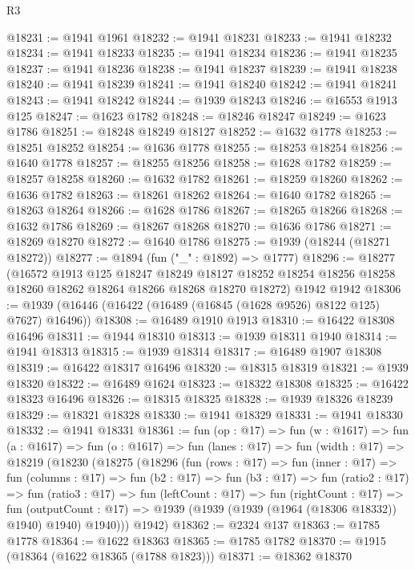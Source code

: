 \begin{lexlean}{R3}
\begin{coremodule}
@18231 := @1941 @1961
@18232 := @1941 @18231
@18233 := @1941 @18232
@18234 := @1941 @18233
@18235 := @1941 @18234
@18236 := @1941 @18235
@18237 := @1941 @18236
@18238 := @1941 @18237
@18239 := @1941 @18238
@18240 := @1941 @18239
@18241 := @1941 @18240
@18242 := @1941 @18241
@18243 := @1941 @18242
@18244 := @1939 @18243
@18246 := @16553 @1913 @125
@18247 := @1623 @1782
@18248 := @18246 @18247
@18249 := @1623 @1786
@18251 := @18248 @18249 @18127
@18252 := @1632 @1778
@18253 := @18251 @18252
@18254 := @1636 @1778
@18255 := @18253 @18254
@18256 := @1640 @1778
@18257 := @18255 @18256
@18258 := @1628 @1782
@18259 := @18257 @18258
@18260 := @1632 @1782
@18261 := @18259 @18260
@18262 := @1636 @1782
@18263 := @18261 @18262
@18264 := @1640 @1782
@18265 := @18263 @18264
@18266 := @1628 @1786
@18267 := @18265 @18266
@18268 := @1632 @1786
@18269 := @18267 @18268
@18270 := @1636 @1786
@18271 := @18269 @18270
@18272 := @1640 @1786
@18275 := @1939 (@18244 (@18271 @18272))
@18277 := @1894 (fun ("_" : @1892) => @1777)
@18296 := @18277
    (@16572
      @1913
      @125
      @18247
      @18249
      @18127
      @18252
      @18254
      @18256
      @18258
      @18260
      @18262
      @18264
      @18266
      @18268
      @18270
      @18272)
    @1942
    @1942
@18306 := @1939 (@16446 (@16422 (@16489 (@16845 (@1628 @9526) @8122 @125) @7627) @16496))
@18308 := @16489 @1910 @1913
@18310 := @16422 @18308 @16496
@18311 := @1944 @18310
@18313 := @1939 @18311 @1940
@18314 := @1941 @18313
@18315 := @1939 @18314
@18317 := @16489 @1907 @18308
@18319 := @16422 @18317 @16496
@18320 := @18315 @18319
@18321 := @1939 @18320
@18322 := @16489 @1624
@18323 := @18322 @18308
@18325 := @16422 @18323 @16496
@18326 := @18315 @18325
@18328 := @1939 @18326 @18239
@18329 := @18321 @18328
@18330 := @1941 @18329
@18331 := @1941 @18330
@18332 := @1941 @18331
@18361 := fun (op : @17) =>
  fun (w : @1617) =>
  fun (a : @1617) =>
  fun (o : @1617) =>
  fun (lanes : @17) =>
  fun (width : @17) =>
  @18219
    (@18230
      (@18275
        (@18296
          (fun (rows : @17) =>
          fun (inner : @17) =>
          fun (columns : @17) =>
          fun (b2 : @17) =>
          fun (b3 : @17) =>
          fun (ratio2 : @17) =>
          fun (ratio3 : @17) =>
          fun (leftCount : @17) =>
          fun (rightCount : @17) =>
          fun (outputCount : @17) =>
          @1939 (@1939 (@1939 (@1964 (@18306 @18332)) @1940) @1940) @1940)))
      @1942)
@18362 := @2324 @137
@18363 := @1785 @1778
@18364 := @1622 @18363
@18365 := @1785 @1782
@18370 := @1915 (@18364 (@1622 @18365 (@1788 @1823)))
@18371 := @18362 @18370

\end{coremodule}
\end{lexlean}
